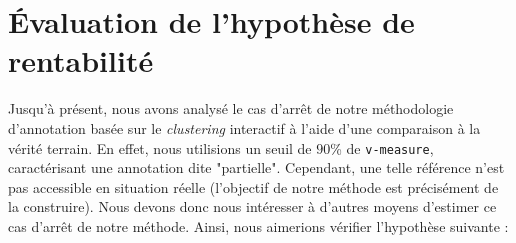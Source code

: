 \section{Évaluation de l'hypothèse de rentabilité}
\label{section:4.5-HYPOTHESE-RENTABILITE}

	Jusqu'à présent, nous avons analysé le cas d'arrêt de notre méthodologie d'annotation basée sur le \textit{clustering} interactif à l'aide d'une comparaison à la vérité terrain.
	En effet, nous utilisions un seuil de $90$\% de \texttt{v-measure}, caractérisant une annotation dite "partielle".
	Cependant, une telle référence n'est pas accessible en situation réelle (l'objectif de notre méthode est précisément de la construire).
	Nous devons donc nous intéresser à d'autres moyens d'estimer ce cas d'arrêt de notre méthode.
	Ainsi, nous aimerions vérifier l'hypothèse suivante :
	
